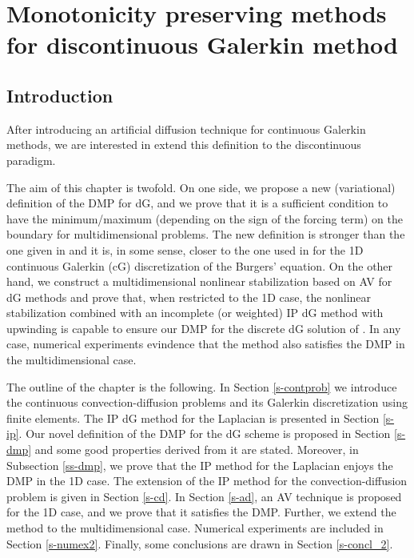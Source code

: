 \chapter{Monotonicity preserving methods for discontinuous Galerkin method}
\label{chap-paper2}

\section{Introduction}

After introducing an artificial diffusion technique for continuous Galerkin methods, we are interested in extend this definition to the discontinuous paradigm.


{The aim of this chapter is twofold. On one side, we propose a new (variational) definition of the DMP for dG, {and we prove that it is a sufficient condition to have the minimum/maximum (depending on the sign of the forcing term) on the boundary for multidimensional problems}. The new definition is stronger than the one given in \cite{horvath_discrete_2013} and it is, in some sense, closer to the one used in \cite{burman_nonlinear_2007} for the 1D continuous Galerkin (cG) discretization of the Burgers' equation. On the other hand, we construct a multidimensional nonlinear stabilization based on AV for dG methods and prove that, when restricted to the 1D case, the nonlinear stabilization combined with an incomplete (or weighted) IP dG method with upwinding is capable to ensure our DMP for the discrete dG solution of . In any case, numerical experiments evindence that the method also satisfies the DMP in the multidimensional case.}


The outline of the chapter is the following. In Section \ref{s-contprob} we introduce the continuous convection-diffusion problems and its Galerkin discretization using finite elements. The IP dG method for the Laplacian is presented in Section \ref{s-ip}. Our novel definition of the DMP for the dG scheme is proposed in Section \ref{s-dmp} and some good properties derived from it are stated. Moreover, in Subsection \ref{ss-dmp}, we prove that the IP method for the Laplacian enjoys the DMP in the 1D case. The extension of the IP method for the convection-diffusion problem  is given in Section \ref{s-cd}. In Section \ref{s-ad}, an AV technique is proposed for the 1D case, and we prove that it satisfies the DMP. Further, we extend the method to the multidimensional case. Numerical experiments are included in Section \ref{s-numex2}. Finally, some conclusions are drawn in Section \ref{s-concl_2}.


